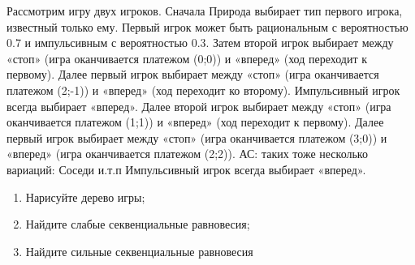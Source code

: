 \begin{problem}
\begin{source}
\cite{lones:dtc}
\end{source}

Рассмотрим игру двух игроков. Сначала Природа выбирает тип первого игрока, известный только ему. Первый игрок может быть рациональным с вероятностью 0.7 и импульсивным с вероятностью 0.3. Затем второй игрок выбирает между «стоп» (игра оканчивается  платежом (0;0)) и «вперед» (ход переходит к первому). Далее первый игрок выбирает между «стоп» (игра оканчивается платежом (2;-1)) и «вперед» (ход переходит ко второму). Импульсивный игрок всегда выбирает «вперед». Далее второй игрок выбирает между «стоп» (игра оканчивается платежом (1;1)) и «вперед» (ход переходит к первому). Далее первый игрок выбирает между «стоп» (игра оканчивается платежом (3;0)) и «вперед» (игра оканчивается платежом (2;2)).
{\red АС: таких тоже несколько вариаций: Соседи и.т.п}
Импульсивный игрок всегда выбирает «вперед». \par
\begin{enumerate}
\item Нарисуйте дерево игры; \par
\item Найдите слабые секвенциальные равновесия; \par
\item  Найдите {\red сильные} секвенциальные равновесия \par

\end{enumerate}


\begin{sol}

\end{sol}
\end{problem}



